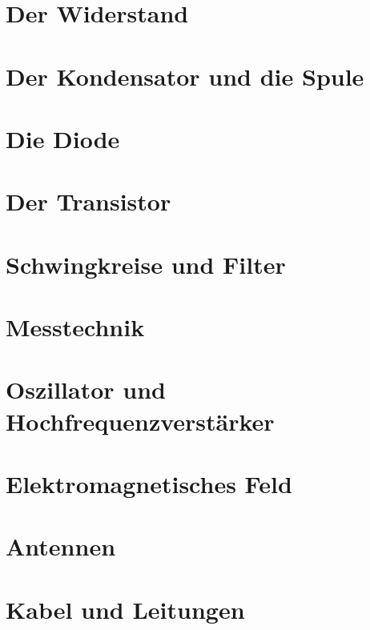 \documentclass[ngerman,openany,twoside]{Script}
\begin{document}


\newpage


\chapter{Der Widerstand}


\chapter{Der Kondensator und die Spule}


\chapter{Die Diode}


\chapter{Der Transistor}


\chapter{Schwingkreise und Filter}


\chapter{Messtechnik}


\chapter{Oszillator und Hochfrequenzverstärker}


\chapter{Elektromagnetisches Feld}


\chapter{Antennen}


\chapter{Kabel und Leitungen}

\end{document}
